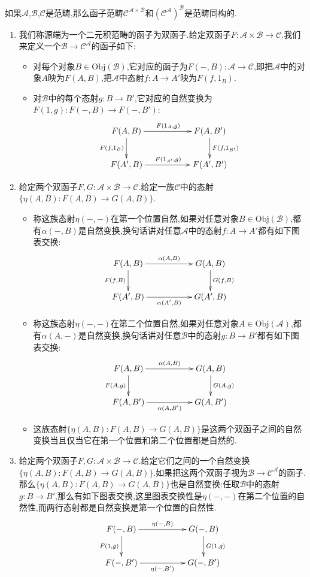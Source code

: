 如果$\mathscr{A}$,$\mathscr{B}$,$\mathscr{C}$是范畴,那么函子范畴$\mathscr{C}^{\mathscr{A}\times\mathscr{B}}$和$(\mathscr{C}^{\mathscr{A}})^{\mathscr{B}}$是范畴同构的.
\begin{enumerate}
	\item 我们称源端为一个二元积范畴的函子为双函子.给定双函子$F:\mathscr{A}\times\mathscr{B}\to\mathscr{C}$.我们来定义一个$\mathscr{B}\to\mathscr{C}^{\mathscr{A}}$的函子如下:
	\begin{itemize}
		\item 对每个对象$B\in\mathrm{Obj}(\mathscr{B})$,它对应的函子为$F(-,B):\mathscr{A}\to\mathscr{C}$,即把$\mathscr{A}$中的对象$A$映为$F(A,B)$,把$\mathscr{A}$中态射$f:A\to A'$映为$F(f,1_B)$.
		\item 对$\mathscr{B}$中的每个态射$g:B\to B'$,它对应的自然变换为$F(1,g):F(-,B)\to F(-,B')$:
		$$\xymatrix{F(A,B)\ar[rr]^{F(1_A,g)}\ar[d]_{F(f,1_B)}&&F(A,B')\ar[d]^{F(f,1_{B'})}\\F(A',B)\ar[rr]^{F(1_{A'},g)}&&F(A',B')}$$
	\end{itemize}
	\item 给定两个双函子$F,G:\mathscr{A}\times\mathscr{B}\to\mathscr{C}$.给定一族$\mathscr{C}$中的态射$\{\eta(A,B):F(A,B)\to G(A,B)\}$.
	\begin{itemize}
		\item 称这族态射$\eta(-,-)$在第一个位置自然,如果对任意对象$B\in\mathrm{Obj}(\mathscr{B})$,都有$\alpha(-,B)$是自然变换,换句话讲对任意$\mathscr{A}$中的态射$f:A\to A'$都有如下图表交换:
		$$\xymatrix{F(A,B)\ar[rr]^{\alpha(A,B)}\ar[d]_{F(f,B)}&&G(A,B)\ar[d]^{G(f,B)}\\F(A',B)\ar[rr]_{\alpha(A',B)}&&G(A',B)}$$
		\item 称这族态射$\eta(-,-)$在第二个位置自然,如果对任意对象$A\in\mathrm{Obj}(\mathscr{A})$,都有$\alpha(A,-)$是自然变换,换句话讲对任意$\mathscr{B}$中的态射$g:B\to B'$都有如下图表交换:
		$$\xymatrix{F(A,B)\ar[rr]^{\alpha(A,B)}\ar[d]_{F(A,g)}&&G(A,B)\ar[d]^{G(A,g)}\\F(A,B')\ar[rr]_{\alpha(A,B')}&&G(A,B')}$$
		\item 这族态射$\{\eta(A,B):F(A,B)\to G(A,B)\}$是这两个双函子之间的自然变换当且仅当它在第一个位置和第二个位置都是自然的.
	\end{itemize}
	\item 给定两个双函子$F,G:\mathscr{A}\times\mathscr{B}\to\mathscr{C}$.给定它们之间的一个自然变换$\{\eta(A,B):F(A,B)\to G(A,B)\}$.如果把这两个双函子视为$\mathscr{B}\to\mathscr{C}^{\mathscr{A}}$的函子.那么$\{\eta(A,B):F(A,B)\to G(A,B)\}$也是自然变换:任取$\mathscr{B}$中的态射$g:B\to B'$,那么有如下图表交换,这里图表交换性是$\eta(-,-)$在第二个位置的自然性,而两行态射都是自然变换是第一个位置的自然性.
	$$\xymatrix{F(-,B)\ar[rr]^{\eta(-,B)}\ar[d]_{F(1,g)}&&G(-,B)\ar[d]^{G(1,g)}\\F(-,B')\ar[rr]_{\eta(-,B')}&&G(-,B')}$$
\end{enumerate}

